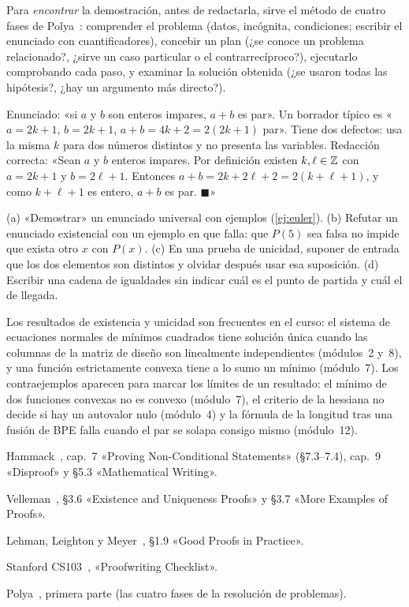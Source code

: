 Para \emph{encontrar} la demostración, antes de redactarla, sirve el método de cuatro fases de Polya~\cite{polya}: comprender el problema (datos, incógnita, condiciones; escribir el enunciado con cuantificadores), concebir un plan (¿se conoce un problema relacionado?, ¿sirve un caso particular o el contrarrecíproco?), ejecutarlo comprobando cada paso, y examinar la solución obtenida (¿se usaron todas las hipótesis?, ¿hay un argumento más directo?).

\begin{ejemplo}\label{ej:redaccion}
Enunciado: «si $a$ y $b$ son enteros impares, $a+b$ es par». Un borrador típico es «$a=2k+1$, $b=2k+1$, $a+b=4k+2=2(2k+1)$ par». Tiene dos defectos: usa la misma $k$ para dos números distintos y no presenta las variables. Redacción correcta: «Sean $a$ y $b$ enteros impares. Por definición existen $k,\ell\in\mathbb{Z}$ con $a=2k+1$ y $b=2\ell+1$. Entonces $a+b=2k+2\ell+2=2(k+\ell+1)$, y como $k+\ell+1$ es entero, $a+b$ es par. $\blacksquare$»
\end{ejemplo}

\begin{observacion}\label{obs:6-errores}
(a) «Demostrar» un enunciado universal con ejemplos (\cref{ej:euler}).
(b) Refutar un enunciado existencial con un ejemplo en que falla: que $P(5)$ sea falsa no impide que exista otro $x$ con $P(x)$.
(c) En una prueba de unicidad, suponer de entrada que los dos elementos son distintos y olvidar después usar esa suposición.
(d) Escribir una cadena de igualdades sin indicar cuál es el punto de partida y cuál el de llegada.
\end{observacion}

\begin{observacion}
Los resultados de existencia y unicidad son frecuentes en el curso: el sistema de ecuaciones normales de mínimos cuadrados tiene solución única cuando las columnas de la matriz de diseño son linealmente independientes (módulos~2 y~8), y una función estrictamente convexa tiene a lo sumo un mínimo (módulo~7). Los contraejemplos aparecen para marcar los límites de un resultado: el mínimo de dos funciones convexas no es convexo (módulo~7), el criterio de la hessiana no decide si hay un autovalor nulo (módulo~4) y la fórmula de la longitud tras una fusión de BPE falla cuando el par se solapa consigo mismo (módulo~12).
\end{observacion}

\begin{lecturas}
\item Hammack~\cite{hammack}, cap.~7 «Proving Non-Conditional Statements» (§7.3–7.4), cap.~9 «Disproof» y §5.3 «Mathematical Writing».
\item Velleman~\cite{velleman}, §3.6 «Existence and Uniqueness Proofs» y §3.7 «More Examples of Proofs».
\item Lehman, Leighton y Meyer~\cite{mcs}, §1.9 «Good Proofs in Practice».
\item Stanford CS103~\cite{cs103}, «Proofwriting Checklist».
\item Polya~\cite{polya}, primera parte (las cuatro fases de la resolución de problemas).
\end{lecturas}

